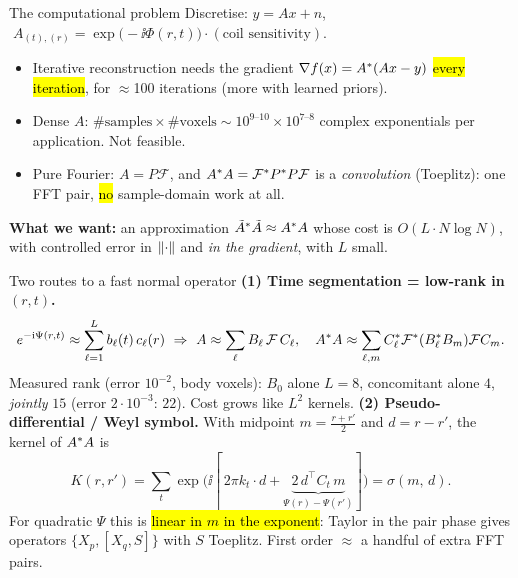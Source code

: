 \begin{frame}{The computational problem}
Discretise: $y=A x+n$, $\;A_{(t),(r)}=\exp\!\big(-\ii\Phi(r,t)\big)\cdot(\text{coil sensitivity})$.
\pause
\begin{itemize}
\item Iterative reconstruction needs the gradient $\nabla f(x)=A^{*}(Ax-y)$ \hl{every iteration}, for $\approx$100 iterations (more with learned priors).
\item Dense $A$: $\#\text{samples}\times\#\text{voxels}\sim10^{9\text{--}10}\times10^{7\text{--}8}$ complex exponentials per application. Not feasible.
\item Pure Fourier: $A=P\mathcal F$, and $A^{*} A = \mathcal F^{*} P^{*} P\mathcal F$ is a \emph{convolution} (Toeplitz): one FFT pair, \hl{no} sample-domain work at all.
\end{itemize}
\pause
\textbf{What we want:} an approximation $\tilde A^{*}\tilde A\approx A^{*} A$ whose cost is $O(L\cdot N\log N)$, with controlled error in $\lVert \cdot\rVert$ and \emph{in the gradient}, with $L$ small.
\end{frame}

\begin{frame}{Two routes to a fast normal operator}
\small
\textbf{(1) Time segmentation = low-rank in $(r,t)$.}
\[ e^{-\ii\Psi(r,t)}\approx\sum_{\ell=1}^{L}b_\ell(t)\,c_\ell(r)\ \Rightarrow\ A\approx\sum_\ell B_\ell\,\mathcal F\,C_\ell,\quad A^\adj A\approx\sum_{\ell,m}C_\ell^\adj\mathcal F^\adj (B_\ell^\adj B_m)\mathcal F C_m .\]
Measured rank (error $10^{-2}$, body voxels): $B_0$ alone $L{=}8$, concomitant alone $4$, \emph{jointly} $15$ (error $2\!\cdot\!10^{-3}$: $22$). Cost grows like $L^2$ kernels.
\pause
\medskip
\textbf{(2) Pseudo-differential / Weyl symbol.} With midpoint $m=\tfrac{r+r'}2$ and $d=r-r'$, the kernel of $A^{*} A$ is
\[ K(r,r')=\sum_t \exp\!\big(\ii[\,2\pi k_t\!\cdot\! d+\underbrace{2\,d^{\!\top}C_t\,m}_{\Psi(r)-\Psi(r')}]\big)=\sigma(m,\,d). \]
For quadratic $\Psi$ this is \hl{linear in $m$ in the exponent}: Taylor in the pair phase gives operators $\{X_p,[X_q,S]\}$ with $S$ Toeplitz. First order $\approx$ a handful of extra FFT pairs.
\end{frame}

